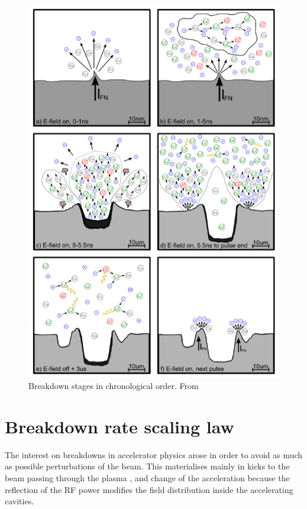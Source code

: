\begin{figure}[h]
\centering
\includegraphics[scale=0.4]{pictures/BD_process}
\caption{Breakdown stages in chronological order. From \cite{Kovermann:1330346}}
\label{BD_rocess}
\end{figure}


\section[Breakdown rate scaling law]{Breakdown rate scaling law}

The interest on breakdowns in accelerator physics arose in order to avoid as much as possible perturbations of the beam. This materialises mainly in kicks to the beam passing through the plasma \cite{Palaia:1625826}, and change of the acceleration because the reflection of the RF power modifies the field distribution inside the accelerating cavities.

